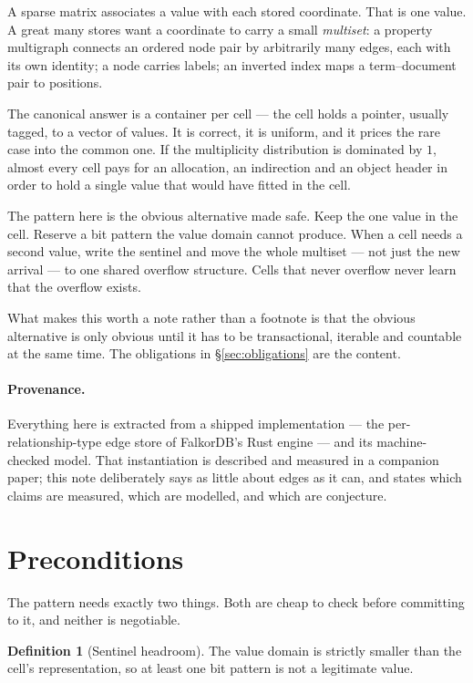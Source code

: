 \documentclass[11pt,a4paper]{article}
\theoremstyle{plain}
\theoremstyle{definition}
\newtheorem{definition}[theorem]{Definition}
\theoremstyle{remark}
\begin{document}
A sparse matrix associates a value with each stored coordinate. That is one
value. A great many stores want a coordinate to carry a small \emph{multiset}:
a property multigraph connects an ordered node pair by arbitrarily many edges,
each with its own identity; a node carries labels; an inverted index maps a
term--document pair to positions.

The canonical answer is a container per cell --- the cell holds a pointer,
usually tagged, to a vector of values. It is correct, it is uniform, and it
prices the rare case into the common one. If the multiplicity distribution is
dominated by $1$, almost every cell pays for an allocation, an indirection and
an object header in order to hold a single value that would have fitted in the
cell.

The pattern here is the obvious alternative made safe. Keep the one value in
the cell. Reserve a bit pattern the value domain cannot produce. When a cell
needs a second value, write the sentinel and move the whole multiset --- not
just the new arrival --- to one shared overflow structure. Cells that never
overflow never learn that the overflow exists.

What makes this worth a note rather than a footnote is that the obvious
alternative is only obvious until it has to be transactional, iterable and
countable at the same time. The obligations in \S\ref{sec:obligations} are the
content.

\paragraph{Provenance.} Everything here is extracted from a shipped
implementation --- the per-relationship-type edge store of FalkorDB's Rust
engine --- and its machine-checked model. That instantiation is described and
measured in a companion paper; this note deliberately says as little about
edges as it can, and states which claims are measured, which are modelled, and
which are conjecture.

\section{Preconditions}
\label{sec:pre}

The pattern needs exactly two things. Both are cheap to check before
committing to it, and neither is negotiable.

\begin{definition}[Sentinel headroom]
The value domain is strictly smaller than the cell's representation, so at
least one bit pattern is not a legitimate value.
\end{definition}
\end{document}
